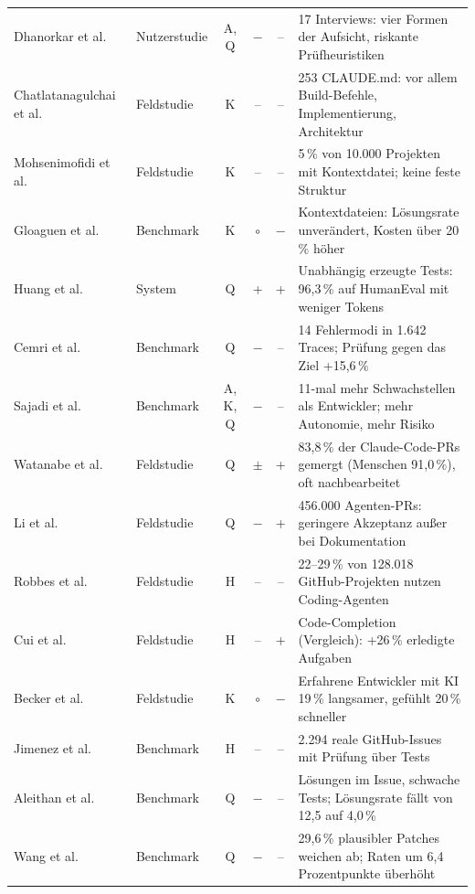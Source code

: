\begin{table}[t]
\begin{tabular}{llcccl}
Dhanorkar et al.~\cite{dhanorkar2026oversight} & Nutzerstudie & A, Q & $-$ & -- & 17 Interviews: vier Formen der Aufsicht, riskante Prüfheuristiken \\
Chatlatanagulchai et al.~\cite{chatlatanagulchai2025manifests} & Feldstudie & K & -- & -- & 253 CLAUDE.md: vor allem Build-Befehle, Implementierung, Architektur \\
Mohsenimofidi et al.~\cite{mohsenimofidi2026context} & Feldstudie & K & -- & -- & 5\,\% von 10.000 Projekten mit Kontextdatei; keine feste Struktur \\
Gloaguen et al.~\cite{gloaguen2026agentsmd} & Benchmark & K & $\circ$ & $-$ & Kontextdateien: Lösungsrate unverändert, Kosten über 20\,\% höher \\
Huang et al.~\cite{huang2023agentcoder} & System & Q & + & + & Unabhängig erzeugte Tests: 96,3\,\% auf HumanEval mit weniger Tokens \\
Cemri et al.~\cite{cemri2025mast} & Benchmark & Q & $-$ & -- & 14 Fehlermodi in 1.642 Traces; Prüfung gegen das Ziel +15,6\,\% \\
Sajadi et al.~\cite{sajadi2025patchsecurity} & Benchmark & A, K, Q & $-$ & -- & 11-mal mehr Schwachstellen als Entwickler; mehr Autonomie, mehr Risiko \\
Watanabe et al.~\cite{watanabe2025agenticprs} & Feldstudie & Q & $\pm$ & + & 83,8\,\% der Claude-Code-PRs gemergt (Menschen 91,0\,\%), oft nachbearbeitet \\
Li et al.~\cite{li2025aidev} & Feldstudie & Q & $-$ & + & 456.000 Agenten-PRs: geringere Akzeptanz außer bei Dokumentation \\
Robbes et al.~\cite{robbes2026agenticmuch} & Feldstudie & H & -- & -- & 22--29\,\% von 128.018 GitHub-Projekten nutzen Coding-Agenten \\
Cui et al.~\cite{cui2025genai} & Feldstudie & H & -- & + & Code-Completion (Vergleich): +26\,\% erledigte Aufgaben \\
Becker et al.~\cite{becker2025metr} & Feldstudie & K & $\circ$ & $-$ & Erfahrene Entwickler mit KI 19\,\% langsamer, gefühlt 20\,\% schneller \\
Jimenez et al.~\cite{jimenez2024swebench} & Benchmark & H & -- & -- & 2.294 reale GitHub-Issues mit Prüfung über Tests \\
Aleithan et al.~\cite{aleithan2024swebenchplus} & Benchmark & Q & $-$ & -- & Lösungen im Issue, schwache Tests; Lösungsrate fällt von 12,5 auf 4,0\,\% \\
Wang et al.~\cite{wang2026solvedissues} & Benchmark & Q & $-$ & -- & 29,6\,\% plausibler Patches weichen ab; Raten um 6,4 Prozentpunkte überhöht \\
\hline
\end{tabular}
\end{table}


